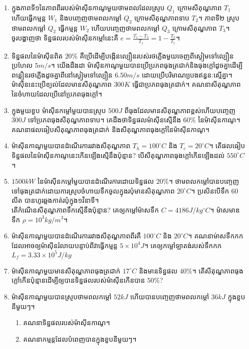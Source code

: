 \begin{enumerate}
\begin{enumerate}
		\end{enumerate}
		\item ក្នុងភាពទី១នៃភាពពីររបស់ម៉ាសុីនកាណូមួយថាមពលដែលស្រូប $Q_{1}$ ក្រោមសីតុណ្ហភាព $T_{1}$ ហើយធ្វើកម្មន្ត $W_{1}$ និងបញ្ចេញថាមពលកម្តៅ $Q_{2}$ ក្រោមសីតុណ្ហភាពទាប $T_{2}$។ ភាពទី២ ស្រូបថាមពលកម្តៅ $Q_{2}$ ធ្វើកម្មន្ត $W_{2}$ ហើយបញ្ចេញថាមពលកម្តៅ $Q_{3}$ ក្រោមសីតុណ្ហភាព $T_{3}$។\\
		ចូរបង្ហាញថា ទិន្នផលរបស់ម៉ាសុីនកម្តៅនេះគឺ $e=\frac{T_{1}-T_{3}}{T_{1}}=1-\frac{T_{3}}{T_{1}}$។ 
		\item ទិន្នផលនៃម៉ាសុីនពិត $20\%$ គឺប្រើដើម្បីបង្កើនល្បឿនរបស់រថភ្លើងមួយចេញពីស្ងៀមទៅល្បឿនប្រហែល $5m/s$។ យើងដឹងដា ម៉ាសុីនកាណូមួយបានប្រើប្រភពធុងត្រជាក់និងធុងក្តៅដូចគ្នាដើម្បីពន្លឿនរថភ្លើងដូចគ្នាពីនៅស្ងៀមទៅល្បឿន $6.50m/s$ ដោយប្រើបរិមាណបេ្រងឥន្ធនៈស្មើគ្នា។ ម៉ាសុីននេះប្រើខ្យល់ដែលមានសីតុណ្ហភាព $300K$ ធ្វើជាប្រភពធុងត្រជាក់។
		គណនាសីតុណ្ហភាពនៃចំហាយដែលប្រើនៅប្រភពធុងក្តៅ។
		\item ក្នុងមួយខួប ម៉ាសុីនកម្តៅមួយបានស្រូប $500J$ ពីធុងដែលមានសីតុណ្ហភាពខ្ពស់ហើយបញ្ចេញ $300J$ ទៅប្រភពធុងសីតុណ្ហភាពទាប។ គេដឹងថាទិន្នផលម៉ាសុីនស្មើនឹង $60\%$ នៃម៉ាសុីនកាណូ។ គណនាផលធៀបសីតុណ្ហភាពធុងត្រជាក់ និងសីតុណ្ហភាពធុងក្តៅនៃម៉ាសុីនកាណូ។
		\item ម៉ាសុីនកាណូមួយបានដំណើរការរវាងសីតុណ្ហភាព $T_{h}=100^\circ C$ និង $T_{c}=20^\circ C$។ តើផលធៀបទិន្នផលនៃម៉ាសុីនកាណូនេះកើនឡើងស្មើនឹងប៉ុន្មាន? បើសីតុណ្ហភាពធុងក្តៅកើនឡើងដល់ $550^\circ C$។
		\item $1500kW$ នៃម៉ាសុីនកម្តៅមួយបានដំណើរការដោយទិន្នផល $20\%$។ ថាមពលកម្តៅបានបញ្ចេញទៅធុងត្រជាក់ដោយការស្រូបចំហាយទឹកចូលក្នុងរបុំមានសិតុណ្ហភាព $20^\circ C$។ ប្រសិនបើទឹក $60$លីត បានហូរឆ្លងកាត់របុំក្នុង១វិនាទី។\\ តើកំណើនសីតុណ្ហភាពទឹកស្មើនឹងប៉ុន្មាន? គេឲ្យកម្តៅម៉ាសទឹក $C=4186J/kg^\circ C$។ ម៉ាសមាឌទឹក $\rho=10^{3}kg/m^{3}$។
		\item ម៉ាសុីនកាណូមួយបានដំណើរការរវាងសីតុណ្ហភាពពីរគឺ $100^\circ C$ និង $20^\circ C$។
		គណនាម់ាសទឹកកកដែលអាចឲ្យម៉ាសុីនរំលាយបន្ទាប់ពីវាធ្វើកម្មន្ត $5\times10^{4}J$។ គេឲ្យកម្តៅឡាតង់របស់ទឹកកក $L_{f}=3.33\times10^{5}J/kg$
		\item ម៉ាសុីនកាណូមួយមានសីតុណ្ហភាពធុងត្រជាក់ $17^\circ C$ និងមានទិន្នផល $40\%$។ តើសីតុណ្ហភាពធុងក្តៅកើនប៉ុន្មានដើម្បីឲ្យបានទិន្នផលរបស់ម៉ាសុីនកើនបាន $50\%$?
		\item ម៉ាសុីនកាណូមួយបានស្រូបថាមពលកម្តៅ $52kJ$ ហើយបានបញ្ចេញថាមពលកម្តៅ $36kJ$ ក្នុងខួបនីមួយៗ។
		\begin{enumerate}
			\item គណនាទិន្នផលរបស់ម៉ាសុីនកាណូ។
			\item គណនាកម្មន្តដែលបំពេញបានក្នុងខួបនីមួយៗ។
		\end{enumerate}
	\end{enumerate}